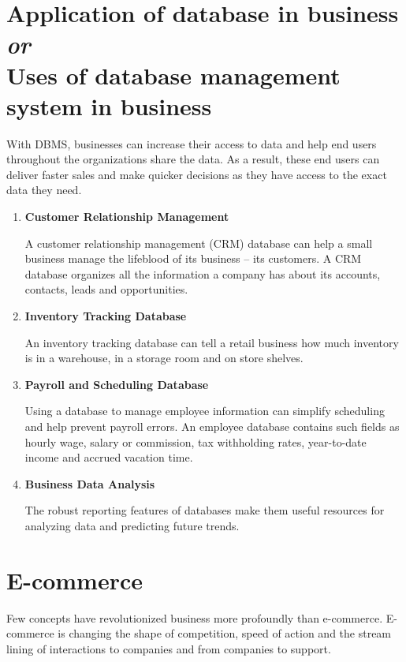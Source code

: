 \documentclass[a4paper]{article}
\begin{document}
\section{Application of database in business\\
\emph{or} \\ 
Uses of database management system in business}
With DBMS, businesses can increase their access to data and help end users
throughout the organizations share the data. As a result, these end users can
deliver faster sales and make quicker decisions as they have access to the
exact data they need.

\begin{enumerate}
  \item \textbf{Customer Relationship Management}

    A customer relationship management (CRM) database can help a small business
    manage the lifeblood of its business – its customers. A CRM database
    organizes all the information a company has about its accounts, contacts,
    leads and opportunities.


  \item \textbf{Inventory Tracking Database}

    An inventory tracking database can tell a retail business how much
    inventory is in a warehouse, in a storage room and on store shelves.


  \item \textbf{Payroll and Scheduling Database}

    Using a database to manage employee information can simplify scheduling and
    help prevent payroll errors. An employee database contains such fields as
    hourly wage, salary or commission, tax withholding rates, year-to-date
    income and accrued vacation time.


  \item \textbf{Business Data Analysis}

    The robust reporting features of databases make them useful resources
    for analyzing data and predicting future trends.
\end{enumerate}

\section{E-commerce}
Few concepts have revolutionized business more profoundly than e-commerce.
E-commerce is changing the shape of competition, speed of action and the stream
lining of interactions to companies and from companies to support.
\end{document}
